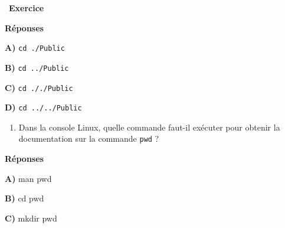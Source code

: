 \documentclass[
  11pt,
]{article}
\providecommand{\tightlist}{%
  \setlength{\itemsep}{0pt}\setlength{\parskip}{0pt}}
\newcounter{exo}
\newenvironment{exercice}[1]
{\par \medskip   \addtocounter{exo}{1} \noindent  
\begin{bclogo}[arrondi =0.1,   noborder = true, logo=\bccrayon, marge=4]{~\textbf{Exercice} \textbf{\theexo} {\itshape #1} }  \par}
{
\end{bclogo}
 \par \bigskip }
\newcounter{def}
\begin{document}
\begin{exercice}{}
\textbf{Réponses}

\textbf{A)} \texttt{cd\ ./Public}

\textbf{B)} \texttt{cd\ ../Public}

\textbf{C)} \texttt{cd\ ././Public}

\textbf{D)} \texttt{cd\ ../../Public}

\begin{enumerate}
\def\labelenumi{\arabic{enumi}.}
\setcounter{enumi}{9}
\tightlist
\item
  Dans la console Linux, quelle commande faut-il exécuter pour obtenir
  la documentation sur la commande \texttt{pwd} ?
\end{enumerate}

\textbf{Réponses}

\textbf{A)} man pwd

\textbf{B)} cd pwd

\textbf{C)} mkdir pwd

\end{exercice}
\end{document}
